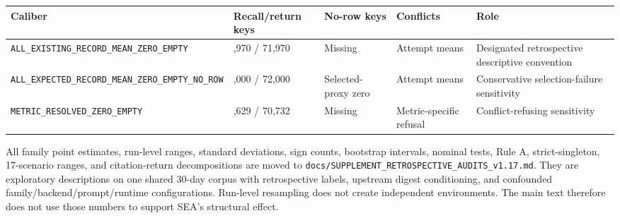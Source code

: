 \documentclass[
  11pt]{article}
\begin{document}
\begin{longtable}[]{@{}
  >{\raggedright\arraybackslash}p{}
  >{\raggedleft\arraybackslash}p{}
  >{\raggedright\arraybackslash}p{}
  >{\raggedright\arraybackslash}p{}
  >{\raggedright\arraybackslash}p{}@{}}
\toprule\noalign{}
\begin{minipage}[b]{\linewidth}\raggedright
Caliber
\end{minipage} & \begin{minipage}[b]{\linewidth}\raggedleft
Recall/return keys
\end{minipage} & \begin{minipage}[b]{\linewidth}\raggedright
No-row keys
\end{minipage} & \begin{minipage}[b]{\linewidth}\raggedright
Conflicts
\end{minipage} & \begin{minipage}[b]{\linewidth}\raggedright
Role
\end{minipage} \\
\midrule\noalign{}
\endhead
\bottomrule\noalign{}
\endlastfoot
\texttt{ALL\_EXISTING\_}\allowbreak \texttt{RECORD\_MEAN\_}\allowbreak \texttt{ZERO\_EMPTY}
& 71,970 / 71,970 & Missing & Attempt means & Designated retrospective
descriptive convention \\
\texttt{ALL\_EXPECTED\_}\allowbreak \texttt{RECORD\_MEAN\_}\allowbreak \texttt{ZERO\_EMPTY\_}\allowbreak \texttt{NO\_ROW}
& 72,000 / 72,000 & Selected-proxy zero & Attempt means & Conservative
selection-failure sensitivity \\
\texttt{METRIC\_RESOLVED\_}\allowbreak \texttt{ZERO\_EMPTY} & 71,629 /
70,732 & Missing & Metric-specific refusal & Conflict-refusing
sensitivity \\
\end{longtable}

All family point estimates, run-level ranges, standard deviations, sign
counts, bootstrap intervals, nominal tests, Rule A, strict-singleton,
17-scenario ranges, and citation-return decompositions are moved to
\texttt{docs/SUPPLEMENT\_RETROSPECTIVE\_AUDITS\_v1.17.md}. They are
exploratory descriptions on one shared 30-day corpus with retrospective
labels, upstream digest conditioning, and confounded
family/backend/prompt/runtime configurations. Run-level resampling does
not create independent environments. The main text therefore does not
use those numbers to support SEA's structural effect.
\end{document}

